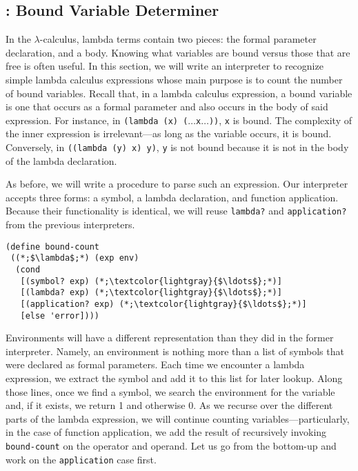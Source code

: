 \clearpage
\subsection*{: Bound Variable Determiner}
In the $\lambda$-calculus, lambda terms contain two pieces: the formal parameter declaration, and a body. Knowing what variables are bound versus those that are free is often useful. In this section, we will write an interpreter to recognize simple lambda calculus expressions whose main purpose is to count the number of bound variables. Recall that, in a lambda calculus expression, a bound variable is one that occurs as a formal parameter and also occurs in the body of said expression. For instance, in \texttt{(lambda (x) ($\ldots$x$\ldots$))}, \texttt{x} is bound. The complexity of the inner expression is irrelevant---as long as the variable occurs, it is bound. Conversely, in \texttt{((lambda (y) x) y)}, \texttt{y} is not bound because it is not in the body of the lambda declaration.

As before, we will write a procedure to parse such an expression. Our interpreter accepts three forms: a symbol, a lambda declaration, and function application. Because their functionality is identical, we will reuse \texttt{lambda?} and \texttt{application?} from the previous interpreters.

\begin{cl}[]{}\begin{lstlisting}[language=MyScheme]
(define bound-count
 ((*;$\lambda$;*) (exp env)
  (cond
   [(symbol? exp) (*;\textcolor{lightgray}{$\ldots$};*)]
   [(lambda? exp) (*;\textcolor{lightgray}{$\ldots$};*)]
   [(application? exp) (*;\textcolor{lightgray}{$\ldots$};*)]
   [else 'error])))
\end{lstlisting}\end{cl}

Environments will have a different representation than they did in the former interpreter. Namely, an environment is nothing more than a list of symbols that were declared as formal parameters. Each time we encounter a lambda expression, we extract the symbol and add it to this list for later lookup. Along those lines, once we find a symbol, we search the environment for the variable and, if it exists, we return 1 and otherwise 0. As we recurse over the different parts of the lambda expression, we will continue counting variables---particularly, in the case of function application, we add the result of recursively invoking \texttt{bound-count} on the operator and operand. Let us go from the bottom-up and work on the \texttt{application} case first.

